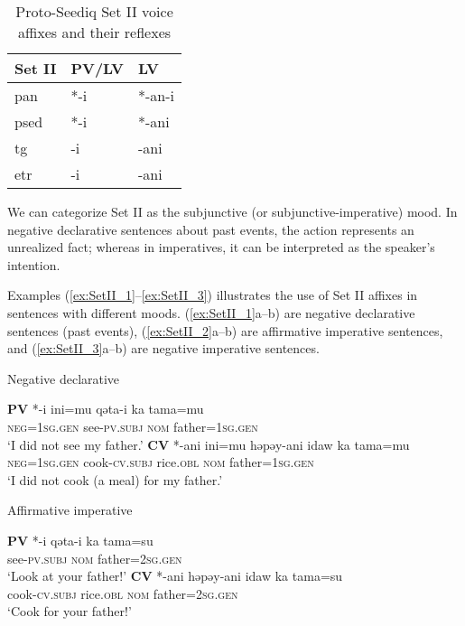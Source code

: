 \begin{table}[!htbp]
\centering
\caption{Proto-Seediq Set II voice affixes and their reflexes}
\label{tab:psed_voi_II}
\begin{tabular}{lll}
\hline
Set II    & PV/LV & LV     \\ \hline
\ac{pan}  & *-i   & *-an-i \\
\ac{psed} & *-i   & *-ani  \\
\ac{tg}   & -i    & -ani   \\
\ac{etr}  & -i    & -ani   \\ \hline
\end{tabular}
\end{table}

We can categorize Set II as the subjunctive (or subjunctive-imperative) mood. In negative declarative sentences about past events, the action represents an unrealized fact; whereas in imperatives, it can be interpreted as the speaker's intention. 

Examples (\ref{ex:SetII_1}--\ref{ex:SetII_3}) illustrates the use of Set II affixes in sentences with different moods. (\ref{ex:SetII_1}a--b) are negative declarative sentences (past events), (\ref{ex:SetII_2}a--b) are affirmative imperative sentences, and (\ref{ex:SetII_3}a--b) are negative imperative sentences.

\begin{exe}
\ex Negative declarative \label{ex:SetII_1}
    \begin{xlist}
    \ex \textbf{PV} *-i
    \gll *ini=mu qəta-i ka tama=mu\\
    \textsc{neg}=\textsc{1sg.gen} see-\textsc{pv.subj} \textsc{nom} father=\textsc{1sg.gen}\\
    \glt `I did not see my father.'
    \ex \textbf{CV} *-ani
    \gll *ini=mu həpəy-ani idaw ka tama=mu\\
    \textsc{neg}=\textsc{1sg.gen} cook-\textsc{cv.subj} rice.\textsc{obl} \textsc{nom} father=\textsc{1sg.gen}\\
    \glt `I did not cook (a meal) for my father.'
    \end{xlist}
\end{exe}

\begin{exe}
\ex Affirmative imperative \label{ex:SetII_2}
    \begin{xlist}
    \ex \textbf{PV} *-i
    \gll *qəta-i ka tama=su\\
    see-\textsc{pv.subj} \textsc{nom} father=\textsc{2sg.gen}\\
    \glt `Look at your father!'
    \ex \textbf{CV} *-ani
    \gll *həpəy-ani idaw ka tama=su\\
    cook-\textsc{cv.subj} rice.\textsc{obl} \textsc{nom} father=\textsc{2sg.gen}\\
    \glt `Cook for your father!'
    \end{xlist}
\end{exe}

